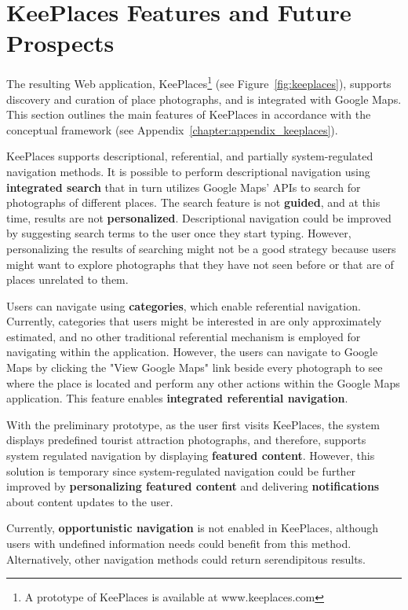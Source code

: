 {\section{KeePlaces Features and Future Prospects}
The resulting Web application, KeePlaces\footnote[1]{A prototype of KeePlaces is available at www.keeplaces.com} (see Figure~\ref{fig:keeplaces}), supports discovery and curation of place photographs, and is integrated with Google Maps. This section outlines the main features of KeePlaces in accordance with the conceptual framework (see Appendix~\ref{chapter:appendix_keeplaces}). 

KeePlaces supports descriptional, referential, and partially system-regulated navigation methods. It is possible to perform descriptional navigation using \textbf{integrated search} that in turn utilizes Google Maps' APIs to search for photographs of different places. The search feature is not \textbf{guided}, and at this time, results are not \textbf{personalized}. Descriptional navigation could be improved by suggesting search terms to the user once they start typing. However, personalizing the results of searching might not be a good strategy because users might want to explore photographs that they have not seen before or that are of places unrelated to them. 

Users can navigate using \textbf{categories}, which enable referential navigation. Currently, categories that users might be interested in are only approximately estimated, and no other traditional referential mechanism is employed for navigating within the application. However, the users can navigate to Google Maps by clicking the "View Google Maps" link beside every photograph to see where the place is located and perform any other actions within the Google Maps application. This feature enables \textbf{integrated referential navigation}. 

With the preliminary prototype, as the user first visits KeePlaces, the system displays predefined tourist attraction photographs, and therefore, supports system regulated navigation by displaying \textbf{featured content}. However, this solution is temporary since system-regulated navigation could be further improved by \textbf{personalizing featured content} and delivering \textbf{notifications} about content updates to the user. 

Currently, \textbf{opportunistic navigation} is not enabled in KeePlaces, although users with undefined information needs could benefit from this method. Alternatively, other navigation methods could return serendipitous results.

}
